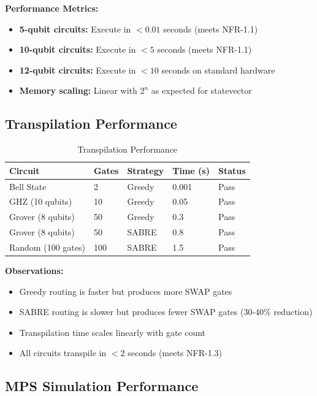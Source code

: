 \textbf{Performance Metrics:}
\begin{itemize}
\item \textbf{5-qubit circuits:} Execute in $< 0.01$ seconds (meets NFR-1.1)
\item \textbf{10-qubit circuits:} Execute in $< 5$ seconds (meets NFR-1.1)
\item \textbf{12-qubit circuits:} Execute in $< 10$ seconds on standard hardware
\item \textbf{Memory scaling:} Linear with $2^n$ as expected for statevector
\end{itemize}

\subsection{Transpilation Performance}

\begin{table}[h]
\centering
\caption{Transpilation Performance}
\begin{tabular}{|p{2.5cm}|p{2cm}|p{2.5cm}|p{2.5cm}|p{2.5cm}|}
\hline
\textbf{Circuit} & \textbf{Gates} & \textbf{Strategy} & \textbf{Time (s)} & \textbf{Status} \\
\hline
Bell State & 2 & Greedy & 0.001 & Pass \\
\hline
GHZ (10 qubits) & 10 & Greedy & 0.05 & Pass \\
\hline
Grover (8 qubits) & 50 & Greedy & 0.3 & Pass \\
\hline
Grover (8 qubits) & 50 & SABRE & 0.8 & Pass \\
\hline
Random (100 gates) & 100 & SABRE & 1.5 & Pass \\
\hline
\end{tabular}
\end{table}

\textbf{Observations:}
\begin{itemize}
\item Greedy routing is faster but produces more SWAP gates
\item SABRE routing is slower but produces fewer SWAP gates (30-40\% reduction)
\item Transpilation time scales linearly with gate count
\item All circuits transpile in $< 2$ seconds (meets NFR-1.3)
\end{itemize}

\subsection{MPS Simulation Performance}

